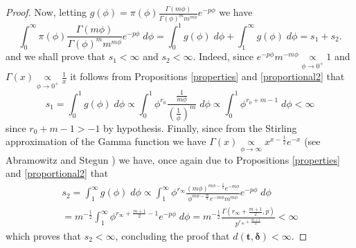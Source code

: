 \documentclass[12pt]{article} %
\theoremstyle{plain}%
\theoremstyle{definition}
\theoremstyle{remark}
\begin{document}
\begin{proof}
Now, letting $g(\phi)=\pi(\phi)\frac{\Gamma(m\phi)}{\Gamma(\phi)^m m^{m \phi}}e^{-p\phi}$ we have
\begin{equation*} \int_{0}^{\infty}\pi(\phi)\frac{\Gamma(m\phi)}{\Gamma(\phi)^m m^{m \phi}}e^{-p\phi}\; d\phi =  \int_{0}^1g(\phi)\; d\phi + \int_1^\infty g(\phi)\; d\phi = s_1+s_2.
\end{equation*}
and we shall prove that $s_1<\infty$ and $s_2<\infty$. Indeed, since
 $e^{-p\phi}m^{-m\phi}\underset{\phi\to 0^+}{\propto}1$ and $\Gamma(x)\underset{\phi\to 0^+}{\propto} \frac{1}{x}$ it follows from Propositions \ref{properties} and \ref{proportional2} that
 \begin{equation*} s_1=\int_{0}^1 g(\phi)\; d\phi \propto \int_0^1 \phi^{r_0}\frac{\frac{1}{m\phi}}{\left(\frac{1}{\phi}\right)^m}\; d\phi \propto \int_0^1 \phi^{r_0+m-1}\; d\phi < \infty
 \end{equation*}
since $r_0+m-1>-1$ by hypothesis. Finally, since from the Stirling approximation of the Gamma function we have $\Gamma(x)\underset{\phi\to \infty}{\propto} x^{x-\frac{1}{2}}e^{-x}$ (see Abramowitz and Stegun \cite{abramowitz}) we have, once again due to Propositions \ref{properties} and \ref{proportional2} that
\begin{equation*}
\begin{aligned}
s_2 = \int_1^\infty g(\phi)\; d\phi \propto \int_{1}^{\infty}\phi^{r_\infty}\frac{(m\phi)^{m\phi-\frac{1}{2}}e^{-m\phi}}{\phi^{m\phi-\frac{m}{2}}e^{-m\phi} m^{m \phi}}e^{-p\phi}\; d\phi\\ = m^{-\frac{1}{2}} \int_1^\infty \phi^{r_\infty+\frac{m+1}{2}-1}e^{-p\phi}\; d\phi = m^{-\frac{1}{2}}\frac{\Gamma\left(r_\infty+\frac{m+1}{2},p\right)}{p^{r_\infty+\frac{m+1}{2}}}<\infty
\end{aligned}
\end{equation*}
which proves that $s_2<\infty$, concluding the proof that $d(\boldsymbol{t,\delta})<\infty$.
\end{proof}

\end{document}
